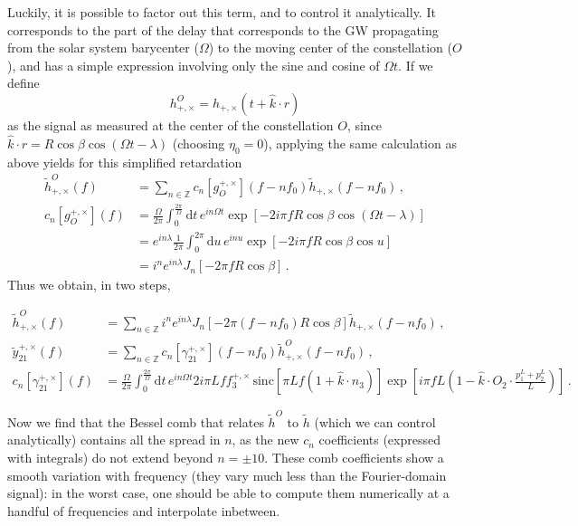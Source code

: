 \documentclass[aps,showpacs,twocolumn,prd,superscriptaddress,nofootinbib]{revtex4}
\newcommand{\be}{\begin{equation}}
\newcommand{\ee}{\end{equation}}
\newcommand\ud{{\mathrm{d}}}
\newcommand{\nn}{\nonumber}
\newcommand{\hatk}{\hat{k}}
\newcommand{\sinc}{\,\mathrm{sinc}}
\begin{document}
Luckily, it is possible to factor out this term, and to control it analytically. It corresponds to the part of the delay that corresponds to the GW propagating from the solar system barycenter ($\Omega$) to the moving center of the constellation ($O$), and has a simple expression involving only the sine and cosine of $\Omega t$. If we define
%
\be
	h_{+,\times}^{O} = h_{+,\times} (t + \hatk \cdot r)
\ee
%
as the signal as measured at the center of the constellation $O$, since $\hatk \cdot r = R \cos \beta \cos(\Omega t - \lambda)$ (choosing $\eta_{0} = 0$), applying the same calculation as above yields for this simplified retardation
%
\begin{align}
	\tilde{h}_{+,\times}^{O}\left(f\right) &= \sum\limits_{n\in \mathbb{Z}} c_{n}[g_{O}^{+,\times}]\left(f - n f_{0}\right) \tilde{h}_{+,\times}\left(f - n f_{0}\right)\,, \\
	c_{n}[g_{O}^{+,\times}]\left(f\right) &= \frac{\Omega}{2\pi}\int_{0}^{\frac{2\pi}{\Omega}} \ud t \, e^{i n \Omega t} \exp\left[ -2i \pi f R \cos \beta \cos (\Omega t - \lambda) \right] \nn\\ 
	&= e^{i n \lambda} \frac{1}{2\pi}\int_{0}^{2\pi} \ud u \, e^{i n u} \exp\left[ -2i \pi f R \cos \beta \cos u \right] \nn\\
	&= i^{n}e^{i n \lambda} J_{n}\left[ -2\pi f R \cos \beta \right] \,.
\end{align}
%
Thus we obtain, in two steps,
%
\begin{widetext}
\begin{subequations}
\begin{align}
	\tilde{h}_{+,\times}^{O}\left(f\right) &= \sum\limits_{n\in \mathbb{Z}} i^{n}e^{i n \lambda} J_{n}\left[ -2\pi \left(f - n f_{0}\right) R \cos \beta \right]\tilde{h}_{+,\times}\left(f - n f_{0}\right)\,, \\
	\tilde{y}_{21}^{+,\times}(f) &= \sum\limits_{n\in \mathbb{Z}} c_{n}[\gamma_{21}^{+,\times}]\left(f - n f_{0}\right) \tilde{h}_{+,\times}^{O}\left(f - n f_{0}\right)\,, \\
	c_{n}[\gamma_{21}^{+,\times}]\left(f\right) &= \frac{\Omega}{2\pi}\int_{0}^{\frac{2\pi}{\Omega}} \ud t \, e^{i n \Omega t} 2 i\pi L f f_{3}^{+,\times}\sinc\left[ \pi L f (1+\hatk \cdot n_{3})\right]\exp\left[ i \pi f L\left(1 - \hatk \cdot O_{2} \cdot \frac{p_{1}^{L}+p_{2}^{L}}{L} \right) \right] \,.
\end{align}
\end{subequations}
\end{widetext}
%
Now we find that the Bessel comb that relates $\tilde{h}^{O}$ to $\tilde{h}$ (which we can control analytically) contains all the spread in $n$, as the new $c_{n}$ coefficients (expressed with integrals) do not extend beyond $n=\pm 10$. These comb coefficients show a smooth variation with frequency (they vary much less than the Fourier-domain signal): in the worst case, one should be able to compute them numerically at a handful of frequencies and interpolate inbetween.
\end{document}
